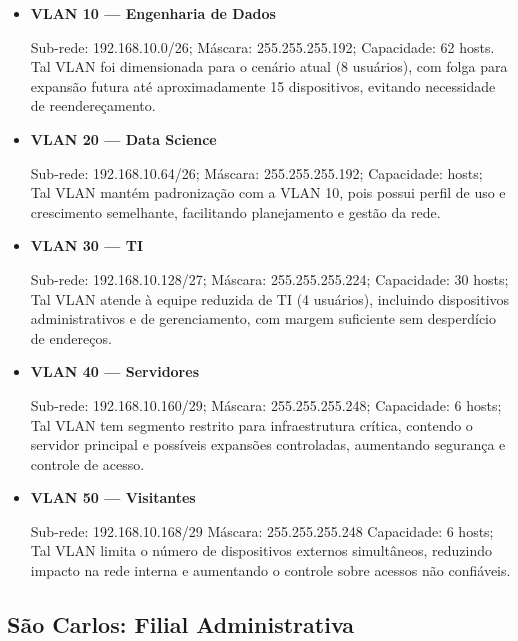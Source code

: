 \documentclass[12pt,a4paper]{article}
\begin{document}
\begin{itemize}

\item \textbf{VLAN 10 — Engenharia de Dados}  

Sub-rede: 192.168.10.0/26;  Máscara: 255.255.255.192; 
Capacidade: 62 hosts. \\
Tal VLAN foi dimensionada para o cenário atual (8 usuários), com folga para expansão futura até aproximadamente 15 dispositivos, evitando necessidade de reendereçamento.

\item \textbf{VLAN 20 — Data Science}  

Sub-rede: 192.168.10.64/26;
Máscara: 255.255.255.192;
Capacidade:   hosts;\\
Tal VLAN mantém padronização com a VLAN 10, pois possui perfil de uso e crescimento semelhante, facilitando planejamento e gestão da rede.

\item \textbf{VLAN 30 — TI}  

Sub-rede: 192.168.10.128/27;
Máscara: 255.255.255.224;
Capacidade: 30 hosts;\\
Tal VLAN atende à equipe reduzida de TI (4 usuários), incluindo dispositivos administrativos e de gerenciamento, com margem suficiente sem desperdício de endereços.

\item \textbf{VLAN 40 — Servidores}  

Sub-rede: 192.168.10.160/29;
Máscara: 255.255.255.248;
Capacidade: 6 hosts;\\ 
Tal VLAN tem segmento restrito para infraestrutura crítica, contendo o servidor principal e possíveis expansões controladas, aumentando segurança e controle de acesso.

\item \textbf{VLAN 50 — Visitantes}  

Sub-rede: 192.168.10.168/29  
Máscara: 255.255.255.248  
Capacidade: 6 hosts;\\
Tal VLAN limita o número de dispositivos externos simultâneos, reduzindo impacto na rede interna e aumentando o controle sobre acessos não confiáveis.

\end{itemize}



\subsection{São Carlos: Filial Administrativa}
\end{document}
